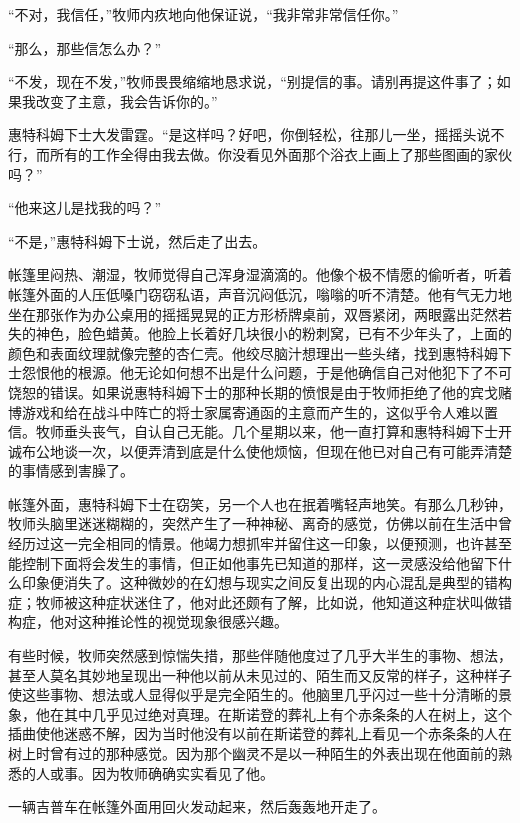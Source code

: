     “不对，我信任，”牧师内疚地向他保证说，“我非常非常信任你。”

    “那么，那些信怎么办？”

    “不发，现在不发，”牧师畏畏缩缩地恳求说，“别提信的事。请别再提这件事了；如果我改变了主意，我会告诉你的。”

    惠特科姆下士大发雷霆。“是这样吗？好吧，你倒轻松，往那儿一坐，摇摇头说不行，而所有的工作全得由我去做。你没看见外面那个浴衣上画上了那些图画的家伙吗？”

    “他来这儿是找我的吗？”

    “不是，”惠特科姆下士说，然后走了出去。

    帐篷里闷热、潮湿，牧师觉得自己浑身湿滴滴的。他像个极不情愿的偷听者，听着帐篷外面的人压低嗓门窃窃私语，声音沉闷低沉，嗡嗡的听不清楚。他有气无力地坐在那张作为办公桌用的摇摇晃晃的正方形桥牌桌前，双唇紧闭，两眼露出茫然若失的神色，脸色蜡黄。他脸上长着好几块很小的粉刺窝，已有不少年头了，上面的颜色和表面纹理就像完整的杏仁壳。他绞尽脑汁想理出一些头绪，找到惠特科姆下士怨恨他的根源。他无论如何想不出是什么问题，于是他确信自己对他犯下了不可饶恕的错误。如果说惠特科姆下士的那种长期的愤恨是由于牧师拒绝了他的宾戈赌博游戏和给在战斗中阵亡的将士家属寄通函的主意而产生的，这似乎令人难以置信。牧师垂头丧气，自认自己无能。几个星期以来，他一直打算和惠特科姆下士开诚布公地谈一次，以便弄清到底是什么使他烦恼，但现在他已对自己有可能弄清楚的事情感到害臊了。

    帐篷外面，惠特科姆下士在窃笑，另一个人也在抿着嘴轻声地笑。有那么几秒钟，牧师头脑里迷迷糊糊的，突然产生了一种神秘、离奇的感觉，仿佛以前在生活中曾经历过这一完全相同的情景。他竭力想抓牢并留住这一印象，以便预测，也许甚至能控制下面将会发生的事情，但正如他事先已知道的那样，这一灵感没给他留下什么印象便消失了。这种微妙的在幻想与现实之间反复出现的内心混乱是典型的错构症；牧师被这种症状迷住了，他对此还颇有了解，比如说，他知道这种症状叫做错构症，他对这种推论性的视觉现象很感兴趣。
 


    有些时候，牧师突然感到惊惴失措，那些伴随他度过了几乎大半生的事物、想法，甚至人莫名其妙地呈现出一种他以前从未见过的、陌生而又反常的样子，这种样子使这些事物、想法或人显得似乎是完全陌生的。他脑里几乎闪过一些十分清晰的景象，他在其中几乎见过绝对真理。在斯诺登的葬礼上有个赤条条的人在树上，这个插曲使他迷惑不解，因为当时他没有以前在斯诺登的葬礼上看见一个赤条条的人在树上时曾有过的那种感觉。因为那个幽灵不是以一种陌生的外表出现在他面前的熟悉的人或事。因为牧师确确实实看见了他。

    一辆吉普车在帐篷外面用回火发动起来，然后轰轰地开走了。

